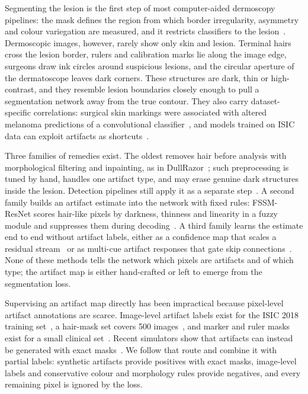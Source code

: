 Segmenting the lesion is the first step of most computer-aided dermoscopy pipelines: the mask defines the region from which border irregularity, asymmetry and colour variegation are measured, and it restricts classifiers to the lesion~\cite{mirikharaji2023survey}. Dermoscopic images, however, rarely show only skin and lesion. Terminal hairs cross the lesion border, rulers and calibration marks lie along the image edge, surgeons draw ink circles around suspicious lesions, and the circular aperture of the dermatoscope leaves dark corners. These structures are dark, thin or high-contrast, and they resemble lesion boundaries closely enough to pull a segmentation network away from the true contour. They also carry dataset-specific correlations: surgical skin markings were associated with altered melanoma predictions of a convolutional classifier~\cite{winkler2019markings}, and models trained on ISIC data can exploit artifacts as shortcuts~\cite{bissoto2020debiasing,geirhos2020shortcut}.

Three families of remedies exist. The oldest removes hair before analysis with morphological filtering and inpainting, as in DullRazor~\cite{lee1997dullrazor,telea2004inpainting}; such preprocessing is tuned by hand, handles one artifact type, and may erase genuine dark structures inside the lesion. Detection pipelines still apply it as a separate step~\cite{rana2025explainable}. A second family builds an artifact estimate into the network with fixed rules: FSSM-ResNet scores hair-like pixels by darkness, thinness and linearity in a fuzzy module and suppresses them during decoding~\cite{raikhankyzy2026fssm}. A third family learns the estimate end to end without artifact labels, either as a confidence map that scales a residual stream~\cite{singh2025dualresolution} or as multi-cue artifact responses that gate skip connections~\cite{gong2026artifactaware}. None of these methods tells the network which pixels are artifacts and of which type; the artifact map is either hand-crafted or left to emerge from the segmentation loss.

Supervising an artifact map directly has been impractical because pixel-level artifact annotations are scarce. Image-level artifact labels exist for the ISIC 2018 training set~\cite{bissoto2020debiasing,bissoto2022artifact}, a hair-mask set covers 500 images~\cite{hossain2023hairmask}, and marker and ruler masks exist for a small clinical set~\cite{carrion2023fedd}. Recent simulators show that artifacts can instead be generated with exact masks~\cite{kim2024ssynth,sizikova2026oasis}. We follow that route and combine it with partial labels: synthetic artifacts provide positives with exact masks, image-level labels and conservative colour and morphology rules provide negatives, and every remaining pixel is ignored by the loss.

